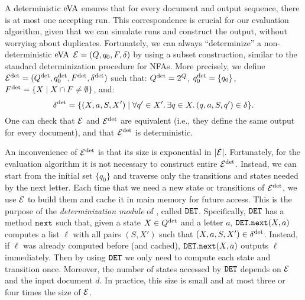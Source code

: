 A deterministic $\mathrm{eVA}$ ensures that for every document and output sequence, there is at most one accepting run. This correspondence is crucial for our evaluation algorithm, given that we can simulate runs and construct the output, without worrying about duplicates. Fortunately, we can always ``determinize'' a non-deterministic $\mathrm{eVA}$ $\mathcal{E} = (Q, q_0, F, \delta)$ by using a subset construction, similar to the standard determinization procedure for NFAs. 
More precisely, we define $\mathcal{E}^{{\operatorname{det}}} = (Q^{{\operatorname{det}}}, q_0^{{\operatorname{det}}}, F^{{\operatorname{det}}}, \delta^{{\operatorname{det}}})$ such that:
 $Q^{{\operatorname{det}}} = 2^Q$, $q_0^{{\operatorname{det}}} = \{q_0\}$, $F^{{\operatorname{det}}} = \{X \mid X \cap F \neq \emptyset\}$, and:
$$
	\delta^{{\operatorname{det}}} = \{(X, a, S, X') \mid \forall q' \in X'. \, \exists q \in X. \, (q, a, S, q') \in \delta\}.
$$
One can check that $\mathcal{E}$ and $\mathcal{E}^{{\operatorname{det}}}$ are equivalent (i.e., they define the same output for every document), and that $\mathcal{E}^{{\operatorname{det}}}$ is deterministic.

An inconvenience of $\mathcal{E}^{{\operatorname{det}}}$ is that its size is exponential in $|\mathcal{E}|$. Fortunately, for the evaluation algorithm it is not necessary to construct entire $\mathcal{E}^{{\operatorname{det}}}$. Instead, we can start from the initial set $\{q_0\}$ and traverse only the transitions and states needed by the next letter. Each time that we need a new state or transitions of $\mathcal{E}^{{\operatorname{det}}}$, we use $\mathcal{E}$ to build them and cache it in main memory for future access. This is the purpose of the \emph{determinization module} of \rematch, called $\mathtt{DET}$. Specifically, $\mathtt{DET}$ has a method $\texttt{next}$ such that, given a state $X \in Q^{\operatorname{det}}$ and a letter $a$, $\mathtt{DET}.\texttt{next}(X, a)$ computes a list $\ell$ with all pairs $(S, X')$ such that $(X,a,S,X') \in \delta^{\operatorname{det}}$. Instead, if $\ell$ was already computed before (and cached), $\mathtt{DET}.\texttt{next}(X, a)$ outputs $\ell$ immediately. Then by using $\mathtt{DET}$ we only need to compute each state and transition once. Moreover, the number of states accessed by $\mathtt{DET}$ depends on $\mathcal{E}$ and the input document $d$. In practice, this size is small and at most three or four times the size of $\mathcal{E}$.

